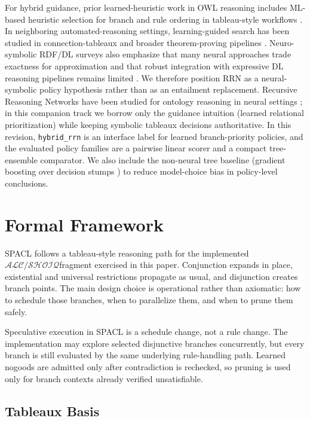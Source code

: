 \documentclass[preprint,12pt,times]{elsarticle}
\newcommand{\dlfrag}{\ensuremath{\mathcal{ALC/SHOIQ}}}
\begin{document}
For hybrid guidance, prior learned-heuristic work in OWL reasoning includes ML-based heuristic selection for branch and rule ordering in tableau-style workflows \cite{mehri2019owlml}. In neighboring automated-reasoning settings, learning-guided search has been studied in connection-tableaux and broader theorem-proving pipelines \cite{farber2021connectiontableaux,blaauwbroek2024learningguided}. Neuro-symbolic RDF/DL surveys also emphasize that many neural approaches trade exactness for approximation and that robust integration with expressive DL reasoning pipelines remains limited \cite{singh2023neurosymbolic}. We therefore position RRN as a neural-symbolic policy hypothesis rather than as an entailment replacement. Recursive Reasoning Networks have been studied for ontology reasoning in neural settings \cite{hohenecker2020ontology}; in this companion track we borrow only the guidance intuition (learned relational prioritization) while keeping symbolic tableaux decisions authoritative. In this revision, \texttt{hybrid\_rrn} is an interface label for learned branch-priority policies, and the evaluated policy families are a pairwise linear scorer and a compact tree-ensemble comparator. We also include the non-neural tree baseline (gradient boosting over decision stumps \cite{friedman2001greedy}) to reduce model-choice bias in policy-level conclusions.

\section{Formal Framework}
\label{sec:formal}

SPACL follows a tableau-style reasoning path for the implemented \dlfrag fragment exercised in this paper. Conjunction expands in place, existential and universal restrictions propagate as usual, and disjunction creates branch points. The main design choice is operational rather than axiomatic: how to schedule those branches, when to parallelize them, and when to prune them safely.

Speculative execution in SPACL is a schedule change, not a rule change. The implementation may explore selected disjunctive branches concurrently, but every branch is still evaluated by the same underlying rule-handling path. Learned nogoods are admitted only after contradiction is rechecked, so pruning is used only for branch contexts already verified unsatisfiable.

\subsection{Tableaux Basis}
\label{sec:tableaux-calculus}
\end{document}
